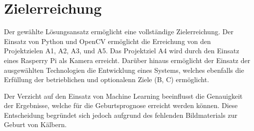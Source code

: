 \section{Zielerreichung}

Der gewählte Lösungsansatz ermöglicht eine vollständige Zielerreichung. Der Einsatz von Python und OpenCV ermöglicht die Erreichung von den Projektzielen A1, A2, A3, und A5. Das Projektziel A4 wird durch den Einsatz eines Rasperry Pi als Kamera erreicht. Darüber hinaus ermöglicht der Einsatz der ausgewählten Technologien die Entwicklung eines Systems, welches ebenfalls die Erfüllung der betrieblichen und optionalenn Ziele (B, C) ermöglicht.

Der Verzicht auf den Einsatz von Machine Learning beeinflusst die Genauigkeit der Ergebnisse, welche für die Geburtsprognose erreicht werden können. Diese Entscheidung begründet sich jedoch aufgrund des fehlenden Bildmaterials zur Geburt von Kälbern.


